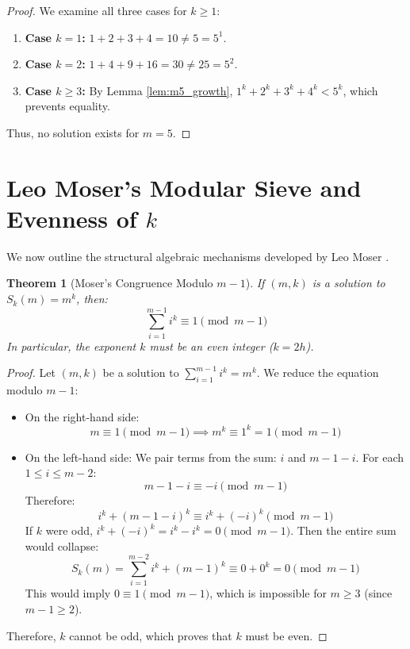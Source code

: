 \documentclass[11pt,a4paper]{article}
\newtheorem{theorem}{Theorem}[section]
\theoremstyle{definition}
\begin{document}
\begin{proof}
We examine all three cases for $k \ge 1$:
\begin{enumerate}
    \item \textbf{Case $k = 1$:} $1 + 2 + 3 + 4 = 10 \ne 5 = 5^1$.
    \item \textbf{Case $k = 2$:} $1 + 4 + 9 + 16 = 30 \ne 25 = 5^2$.
    \item \textbf{Case $k \ge 3$:} By Lemma \ref{lem:m5_growth}, $1^k + 2^k + 3^k + 4^k < 5^k$, which prevents equality.
\end{enumerate}
Thus, no solution exists for $m = 5$.
\end{proof}

\section{Leo Moser's Modular Sieve and Evenness of $k$}

We now outline the structural algebraic mechanisms developed by Leo Moser \cite{moser1953}.

\begin{theorem}[Moser's Congruence Modulo $m-1$]\label{thm:mod_m_minus_1}
If $(m, k)$ is a solution to $S_k(m) = m^k$, then:
\begin{equation}\label{eq:mod_m_minus_1}
\sum_{i=1}^{m-1} i^k \equiv 1 \pmod{m-1}
\end{equation}
In particular, the exponent $k$ must be an even integer ($k = 2h$).
\end{theorem}

\begin{proof}
Let $(m, k)$ be a solution to $\sum_{i=1}^{m-1} i^k = m^k$.
We reduce the equation modulo $m-1$:
\begin{itemize}
    \item On the right-hand side:
    \[ m \equiv 1 \pmod{m-1} \implies m^k \equiv 1^k = 1 \pmod{m-1} \]
    \item On the left-hand side:
    We pair terms from the sum: $i$ and $m-1-i$.
    For each $1 \le i \le m-2$:
    \[ m-1-i \equiv -i \pmod{m-1} \]
    Therefore:
    \[ i^k + (m-1-i)^k \equiv i^k + (-i)^k \pmod{m-1} \]
    If $k$ were odd, $i^k + (-i)^k = i^k - i^k = 0 \pmod{m-1}$.
    Then the entire sum would collapse:
    \[ S_k(m) = \sum_{i=1}^{m-2} i^k + (m-1)^k \equiv 0 + 0^k = 0 \pmod{m-1} \]
    This would imply $0 \equiv 1 \pmod{m-1}$, which is impossible for $m \ge 3$ (since $m-1 \ge 2$).
\end{itemize}
Therefore, $k$ cannot be odd, which proves that $k$ must be even.
\end{proof}
\end{document}
